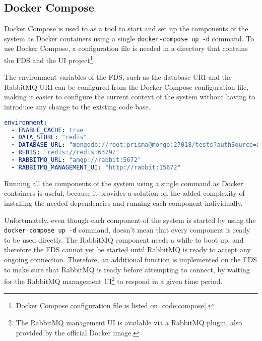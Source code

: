 
 \subsection{Docker Compose}

    Docker Compose is used to as a tool to start and set up the components of the system as Docker containers using a single \verb;docker-compose up -d; command. To use Docker Compose, a configuration file is needed in a directory that contains the FDS and the UI project\footnote{Docker Compose configuration file is listed on \autoref{code:compose}.}.
    
    The environment variables of the FDS, such as the database URI and the RabbitMQ URI can be configured from the Docker Compose configuration file, making it easier to configure the current context of the system without having to introduce any change to the existing code base. 
    
    \begin{lstlisting}[caption={Configuring environment variables of FDS (YAML)}, language=yaml]
environment:
  - ENABLE_CACHE: true
  - DATA_STORE: "redis"
  - DATABASE_URL: "mongodb://root:prisma@mongo:27018/tests?authSource=admin/"
  - REDIS: "redis://redis:6379/"
  - RABBITMQ_URL: "amqp://rabbit:5672"
  - RABBITMQ_MANAGEMENT_UI: "http://rabbit:15672"
    \end{lstlisting}
    
    Running all the components of the system using a single command as Docker containers is useful, because it provides a solution on the added complexity of installing the needed dependencies and running each component individually. 

    Unfortunately, even though each component of the system is started by using the \verb;docker-compose up -d; command, doesn't mean that every component is ready to be used directly. The RabbitMQ component needs a while to boot up, and therefore the FDS cannot yet be started until RabbitMQ is ready to accept any ongoing connection. Therefore, an additional function is implemented on the FDS to make sure that RabbitMQ is ready before attempting to connect, by waiting for the RabbitMQ management UI\footnote{The RabbitMQ management UI is available via a RabbitMQ plugin, also provided by the official Docker image.} to respond in a given time period.